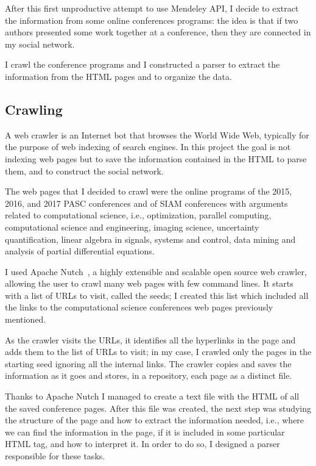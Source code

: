 \documentclass[]{usiinfbachelorproject}
\begin{document}
After this first unproductive attempt to use Mendeley API, I decide to  extract the information from some online conferences programs: the idea is that if two authors presented some work together at a conference, then they are connected in my social network.

I crawl the conference programs and I constructed a parser to extract the information from the HTML pages and to organize the data.

\subsection{Crawling}

A web crawler is an Internet bot that browses the World Wide Web, typically for the purpose of web indexing of search engines. In this project the goal is not indexing web pages but to save the information contained in the HTML to parse them, and to construct the social network.

The web pages that I decided to crawl were the online programs of the 2015, 2016, and 2017 PASC conferences and of SIAM conferences with arguments related to computational science, i.e., optimization, parallel computing, computational science and engineering, imaging science, uncertainty quantification, linear algebra in signals, systems and control, data mining and analysis of partial differential equations.

I used Apache Nutch~\cite{nutch}, a highly extensible and scalable open source web crawler, allowing the user to crawl many web pages with few command lines.
It starts with a list of URLs to visit, called the seeds; I created this list which included all the links to the computational science conferences web pages previously mentioned.

As the crawler visits the URLs, it identifies all the hyperlinks in the page and adds them to the list of URLs to visit; in my case, I crawled only the pages in the starting seed ignoring all the internal links. The crawler copies and saves the information as it goes and stores, in a repository, each page as a distinct file.

Thanks to Apache Nutch I managed to create a text file with the HTML of all the saved conference pages. After this file was created, the next step was studying the structure of the page and how to extract the information needed, i.e., where we can find the information in the page, if it is included in some particular HTML tag, and how to interpret it. In order to do so, I designed a parser responsible for these tasks.
\end{document}
